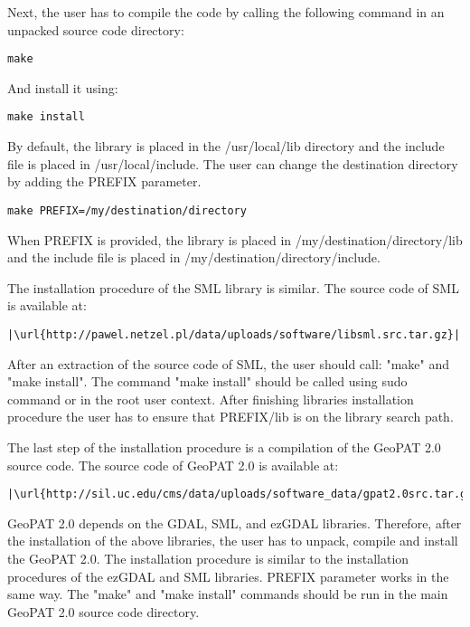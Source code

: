 Next, the user has to compile the code by calling the following command in an unpacked source code directory:

\begin{lstlisting}
make
\end{lstlisting}

And install it using:

\begin{lstlisting}
make install
\end{lstlisting}

By default, the library is placed in the /usr/local/lib directory and the include file is placed in /usr/local/include.
The user can change the destination directory by adding the PREFIX parameter.

\begin{lstlisting}
make PREFIX=/my/destination/directory
\end{lstlisting}

When PREFIX is provided, the library is placed in /my/destination/directory/lib and the include file is placed in /my/destination/directory/include.

The installation procedure of the SML library is similar.
The source code of SML is available at:
\begin{lstlisting}[escapechar=|]
|\url{http://pawel.netzel.pl/data/uploads/software/libsml.src.tar.gz}|
\end{lstlisting}
After an extraction of the source code of SML, the user should call: "make" and "make install".
The command "make install" should be called using sudo command or in the root user context.
After finishing libraries installation procedure the user has to ensure that PREFIX/lib is on the library search path.

The last step of the installation procedure is a compilation of the GeoPAT 2.0 source code.
The source code of GeoPAT 2.0 is available at:
\begin{lstlisting}[escapechar=|]
|\url{http://sil.uc.edu/cms/data/uploads/software_data/gpat2.0src.tar.gz}|
\end{lstlisting}
GeoPAT 2.0 depends on the GDAL, SML, and ezGDAL libraries.
Therefore, after the installation of the above libraries, the user has to unpack, compile and install the GeoPAT 2.0.
The installation procedure is similar to the installation procedures of the ezGDAL and SML libraries.
PREFIX parameter works in the same way.
The "make" and "make install" commands should be run in the main GeoPAT 2.0 source code directory.

